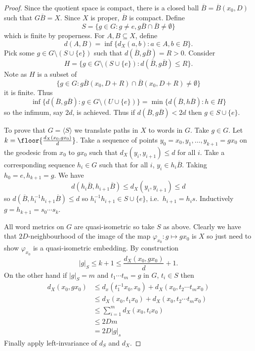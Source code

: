 \documentclass[a4paper]{article}
\begin{document}
\begin{proof}
  Since the quotient space is compact, there is a closed ball \(\overline B = \overline B(x_0, D)\) such that \(G \overline B = X\). Since \(X\) is proper, \(\overline B\) is compact. Define
  \[
    S = \{g \in G: g \ne e, g \overline B \cap \overline B \ne \emptyset\}
  \]
  which is finite by properness. For \(A, B \subseteq X\), define
  \[
    d(A, B) = \inf \{d_X(a, b): a \in A, b \in B\}.
  \]
  Pick some \(g \in G \setminus (S \cup \{e\})\) such that \(d(\overline B, g \overline B) = R > 0\). Consider
  \[
    H = \{g \in G \setminus (S \cup \{e\}): d(\overline B, g \overline B) \leq R\}.
  \]
  Note as \(H\) is a subset of
  \[
    \{g \in G: g \overline B(x_0, D + R) \cap \overline B(x_0, D + R) \ne \emptyset\}
  \]
  it is finite. Thus
  \[
    \inf \{d(\overline B, g \overline B): g \in G \setminus (U \cup \{e\})\} = \min\{d(\overline B, h \overline B): h \in H\}
  \]
  so the infimum, say \(2d\), is achieved. Thus if \(d(\overline B, g \overline B) < 2d\) then \(g \in S \cup \{e\}\).

  To prove that \(G = \langle S\rangle\) we translate paths in \(X\) to words in \(G\). Take \(g \in G\). Let \(k = \floor{\frac{d_X(x_0, gx_0)}{d}}\). Take a sequence of points \(y_0 = x_0, y_1, \dots, y_{k + 1} = gx_0\) on the geodesic from \(x_0\) to \(gx_0\) such that \(d_X(y_i, y_{i + 1}) \leq d\) for all \(i\). Take a corresponding sequence \(h_i \in G\) such that for all \(i\), \(y_i \in h_i \overline B\). Taking \(h_0 = e, h_{k + 1} = g\). We have
  \[
    d(h_i \overline B, h_{i + 1} \overline B) \leq d_X(y_i, y_{i + 1}) \leq d
  \]
  so \(d(\overline B, h_i^{-1}h_{i + 1} \overline B) \leq d\) so \(h_i^{-1}h_{i + 1} \in S \cup \{e\}\), i.e.\ \(h_{i + 1} = h_i s\). Inductively \(g = h_{k + 1} = s_0 \cdots s_k\).

  All word metrics on \(G\) are quasi-isometric so take \(S\) as above. Clearly we have that \(2D\)-neighbourhood of the image of the map \(\varphi_{x_0}: g \mapsto g x_0\) is \(X\) so just need to show \(\varphi_{x_0}\) is a quasi-isometric embedding. By construction
  \[
    |g|_S \leq k + 1 \leq \frac{d_X(x_0, gx_0)}{d} + 1.
  \]
  On the other hand if \(|g|_S = m\) and \(t_1 \cdots t_m = g\) in \(G\), \(t_i \in S\) then
  \begin{align*}
    d_X(x_0, gx_0)
    &\leq d_x(t_1^{-1}x_0, x_0) + d_X(x_0, t_2 \cdots t_m x_0) \\
    &\leq d_X(x_0, t_1 x_0) + d_X(x_0, t_2 \cdots t_m x_0) \\
    &\leq \sum_{i = 1}^m d_X(x_0, t_ix_0) \\
    & \leq 2D m \\
    &= 2D |g|_s
  \end{align*}
  Finally apply left-invariance of \(d_S\) and \(d_X\).
\end{proof}
\end{document}
